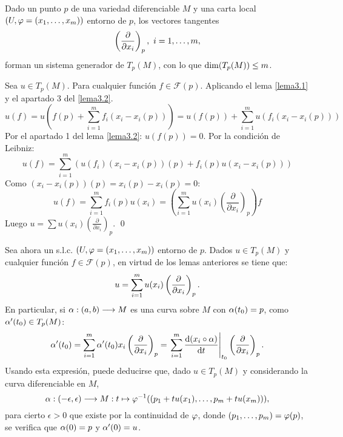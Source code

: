 \documentclass[Cursovd_portada.tex]{subfiles}
\begin{document}
\begin{lemma}\label{lema3.3}
Dado un punto $p$ de una variedad diferenciable $M$ y una carta local $(U,\varphi=(x_1,\dots ,x_m))$ entorno de $p$,
los vectores tangentes
$$\left(\displaystyle{\frac{\partial}{\partial x_i}}\right)_p,\mbox{ }i=1,\dots ,m,$$
forman un sistema generador de $T_p(M)$, con lo que ${\rm dim}(T_p(M))\leq m$.
\end{lemma}
\begin{dem}
Sea $u \in T_p(M)$. Para cualquier función $f \in \mathcal{F}(p)$. Aplicando el lema \ref{lema3.1} y el apartado 3 del \ref{lema3.2}.
\[ u(f) = u(f(p)+\sum_{i=1}^m f_i(x_i-x_i(p))) = u(f(p)) + \sum_{i=1}^m u(f_i(x_i-x_i(p))) \]
Por el apartado 1 del lema \ref{lema3.2}: $u(f(p))=0$. Por la condición de Leibniz:
\[ u(f) = \sum_{i=1}^m ( u(f_i)(x_i-x_i(p))(p) + f_i(p) u(x_i-x_i(p))) \]
Como $(x_i-x_i(p))(p)=x_i(p)-x_i(p)=0$:
\[ u(f) = \sum_{i=1}^m f_i(p) u(x_i) = \left(\sum_{i=1}^m u(x_i) \left(\frac{\partial}{\partial x_i}\right)_p\right)f \]
Luego $u = \sum u(x_i) \left(\frac{\partial}{\partial x_i}\right)_p$.
\qed
\end{dem}
Sea ahora un s.l.c. $(U,\varphi=(x_1,\dots ,x_m))$ entorno de $p$. Dados $u\in T_p(M)$ y cualquier función
$f\in\mathcal{F}(p)$, en virtud de los lemas anteriores se tiene que:
$$u=\sum_{i=1}^mu(x_i)\left(\displaystyle{\frac{\partial}{\partial x_i}}\right)_p.$$
\hs En particular, si $\alpha:(a,b)\longrightarrow M$ es una curva sobre $M$ con $\alpha(t_0)=p$, como $\alpha'(t_0)\in T_p(M)$:
$$\alpha'(t_0)=\sum_{i=1}^m\alpha'(t_0)x_i\left(\displaystyle{\frac{\partial}{\partial x_i}}\right)_p=
\left.\sum_{i=1}^m\displaystyle{\frac{{\rm d} (x_i\circ\alpha)}{{\rm d} t}}\right|_{t_0}\left(\displaystyle{\frac{\partial}{\partial x_i}}\right)_p.$$ \hs Usando esta expresión, puede
deducirse que, dado $u\in T_p(M)$ y considerando la curva diferenciable en $M$,
$$\alpha:(-\epsilon,\epsilon)\longrightarrow M:t\mapsto \varphi^{-1}((p_1+tu(x_1),\dots ,p_m+tu(x_m))),$$
para cierto $\epsilon>0$ que existe por la continuidad de $\varphi$, donde $(p_1,\dots ,p_m)=\varphi(p)$, se verifica que
$\alpha(0)=p$ y $\alpha'(0)=u$.
\end{document}

